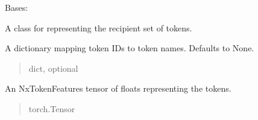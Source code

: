 \documentclass[letterpaper,10pt,english]{sphinxmanual}
\begin{document}
\begin{fulllineitems}
\label{\detokenize{nodes:nodes.nodeTensors.Recipient}}
\pysigstartsignatures
\pysiglinewithargsret
{}
{\sphinxparamcomma {}\sphinxparamcomma {}\sphinxparamcomma {}}
{}
\pysigstopsignatures
\sphinxAtStartPar
Bases: {\hyperref[\detokenize{nodes:nodes.nodeTensors.Tokens}]{}}

\sphinxAtStartPar
A class for representing the recipient set of tokens.

\begin{fulllineitems}
\label{\detokenize{nodes:nodes.nodeTensors.Recipient.names}}
\pysigstartsignatures
\pysigline
{}
\pysigstopsignatures
\sphinxAtStartPar
A dictionary mapping token IDs to token names. Defaults to None.
\begin{quote}\begin{description}
\sphinxAtStartPar
dict, optional

\end{description}\end{quote}

\end{fulllineitems}


\begin{fulllineitems}
\label{\detokenize{nodes:nodes.nodeTensors.Recipient.nodes}}
\pysigstartsignatures
\pysigline
{}
\pysigstopsignatures
\sphinxAtStartPar
An NxTokenFeatures tensor of floats representing the tokens.
\begin{quote}\begin{description}
\sphinxAtStartPar
torch.Tensor

\end{description}\end{quote}

\end{fulllineitems}


\end{fulllineitems}
\end{document}
